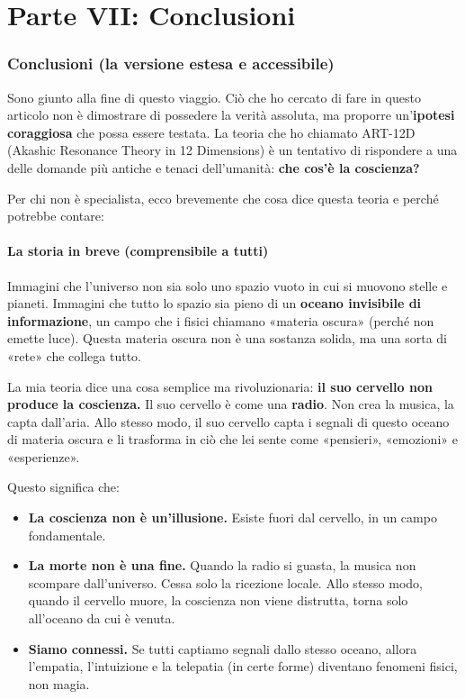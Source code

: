 \part*{Parte VII: Conclusioni}

\section{Conclusioni (la versione estesa e accessibile)}
Sono giunto alla fine di questo viaggio. Ciò che ho cercato di fare in questo articolo non è dimostrare di possedere la verità assoluta, ma proporre un'\textbf{ipotesi coraggiosa} che possa essere testata. La teoria che ho chiamato ART-12D (Akashic Resonance Theory in 12 Dimensions) è un tentativo di rispondere a una delle domande più antiche e tenaci dell'umanità: \textbf{che cos'è la coscienza?}

Per chi non è specialista, ecco brevemente che cosa dice questa teoria e perché potrebbe contare:

\subsection{La storia in breve (comprensibile a tutti)}
Immagini che l'universo non sia solo uno spazio vuoto in cui si muovono stelle e pianeti. Immagini che tutto lo spazio sia pieno di un \textbf{oceano invisibile di informazione}, un campo che i fisici chiamano «materia oscura» (perché non emette luce). Questa materia oscura non è una sostanza solida, ma una sorta di «rete» che collega tutto.

La mia teoria dice una cosa semplice ma rivoluzionaria: \textbf{il suo cervello non produce la coscienza.} Il suo cervello è come una \textbf{radio}. Non crea la musica, la capta dall'aria. Allo stesso modo, il suo cervello capta i segnali di questo oceano di materia oscura e li trasforma in ciò che lei sente come «pensieri», «emozioni» e «esperienze».

Questo significa che:
\begin{itemize}
    \item \textbf{La coscienza non è un'illusione.} Esiste fuori dal cervello, in un campo fondamentale.
    \item \textbf{La morte non è una fine.} Quando la radio si guasta, la musica non scompare dall'universo. Cessa solo la ricezione locale. Allo stesso modo, quando il cervello muore, la coscienza non viene distrutta, torna solo all'oceano da cui è venuta.
    \item \textbf{Siamo connessi.} Se tutti captiamo segnali dallo stesso oceano, allora l'empatia, l'intuizione e la telepatia (in certe forme) diventano fenomeni fisici, non magia.
\end{itemize}

